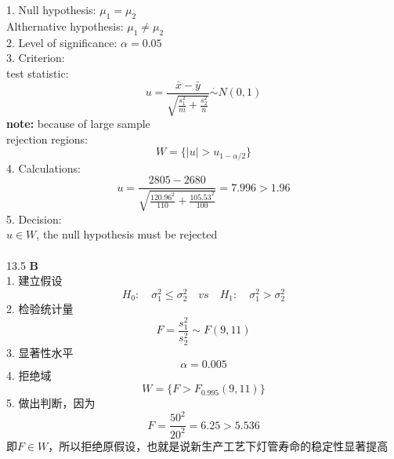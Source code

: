 \documentclass[a4paper]{ctexart}    %
\begin{document}
	1. Null hypothesis: $ \mu_1 = \mu_2 $ \\
	Althernative hypothesis: $ \mu_1 \neq \mu_2 $ \\
	2. Level of significance: $ \alpha = 0.05 $ \\
	3. Criterion: \\
	test statistic:
	\begin{equation*}
		u = \frac{\bar{x} - \bar{y}}{\sqrt{\frac{s_1^2}{m} + \frac{s_2^2}{n}}} \overset{\cdot}{\sim} N(0, 1)
	\end{equation*} 
	\textbf{note:} because of large sample \\
	rejection regions: \\
	\begin{equation*}
		W = \{|u| > u_{1-\alpha / 2}\}
	\end{equation*}
	4. Calculations: \\
	\begin{equation*}
		u = \frac{2805 - 2680}{\sqrt{\frac{120.96^2}{110} + \frac{105.53^2}{100}}} = 7.996 > 1.96
	\end{equation*}
	5. Decision: \\
	$ u \in W $, the null hypothesis must be rejected \\ \\
	13.5 \quad \textbf{B} \\
	1. 建立假设
	\begin{equation*}
		H_0: \quad \sigma_1^2 \leq \sigma_2^2 \quad vs \quad H_1:\quad \sigma_1^2 > \sigma_2^2
	\end{equation*}
	2. 检验统计量
	\begin{equation*}
		F = \frac{s_1^2}{s_2^2} \sim F(9, 11)
	\end{equation*}
	3. 显著性水平
	\begin{equation*}
		\alpha = 0.005
	\end{equation*}
	4. 拒绝域
	\begin{equation*}
		W = \{F > F_{0.995}(9, 11)\}
	\end{equation*}
	5. 做出判断，因为
	\begin{equation*}
		F = \frac{50^2}{20^2} = 6.25 > 5.536
	\end{equation*}
	即$ F \in W $，所以拒绝原假设，也就是说新生产工艺下灯管寿命的稳定性显著提高
	\newpage
\end{document}
